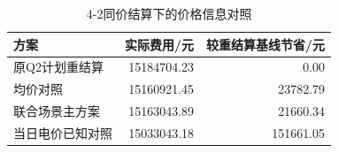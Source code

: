 \begin{table}[htbp]\centering\small
\caption{4-2同价结算下的价格信息对照}
\begin{tabular}{lrr}\toprule
方案 & 实际费用/元 & 较重结算基线节省/元\\\midrule
原Q2计划重结算 & 15184704.23 & 0.00\\
均价对照 & 15160921.45 & 23782.79\\
联合场景主方案 & 15163043.89 & 21660.34\\
当日电价已知对照 & 15033043.18 & 151661.05\\
\bottomrule\end{tabular}\end{table}
